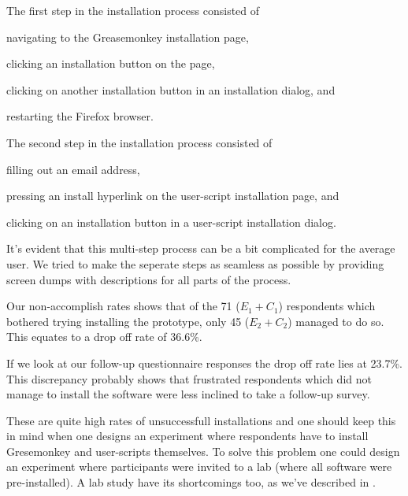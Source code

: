 The first step in the installation process consisted of
\begin{inparaenum}[(i)]
  \item navigating to the Greasemonkey installation page,
  \item clicking an installation button on the page,
  \item clicking on another installation button in an installation
    dialog, and
  \item restarting the Firefox browser.
\end{inparaenum}
The second step in the installation process consisted of
\begin{inparaenum}[(i)]
  \item filling out an email address,%
  \item pressing an install hyperlink on the user-script installation page,
    and
  \item clicking on an installation button in a user-script installation
    dialog.
\end{inparaenum}
It's evident that this multi-step process can be a bit complicated for the
average user. We tried to make the seperate steps as seamless as possible
by providing screen dumps with descriptions for all parts of the process.

Our non-accomplish rates%
shows that of the 71 ($E_1 + C_1$) respondents which bothered trying
installing the prototype, only 45 ($E_2 + C_2$) managed to do so. This equates
to a drop off rate of 36.6\%.

If we look at our follow-up questionnaire responses%
the drop off rate lies at 23.7\%. This discrepancy probably shows that
frustrated respondents which did not manage to install the software were less
inclined to take a follow-up survey.

These are quite high rates of unsuccessfull
installations and one should keep this in mind when one designs an
experiment where respondents have to install Gresemonkey and user-scripts
themselves. To solve this problem one could design an experiment where
participants were invited to a lab (where all software were pre-installed). A
lab study have its shortcomings too, as we've described in
.

